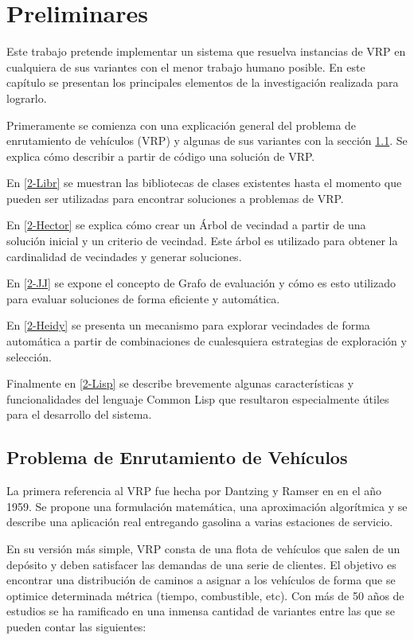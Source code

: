 \chapter{Preliminares}\label{chapter:REV-LL}

Este trabajo pretende implementar un sistema que resuelva instancias de VRP en cualquiera de sus variantes con el menor trabajo humano posible. En este capítulo se presentan los principales elementos de la investigación realizada para lograrlo.

Primeramente se comienza con una explicación general del problema de enrutamiento de vehículos (VRP) y algunas de sus variantes con la sección \ref{2-VRPintro}. Se explica cómo describir a partir de código una solución de VRP.

En \ref{2-Libr} se muestran las bibliotecas de clases existentes hasta el momento que pueden ser utilizadas para encontrar soluciones a problemas de VRP.

En \ref{2-Hector} se explica cómo crear un Árbol de vecindad a partir de una solución inicial y un criterio de vecindad. Este árbol es utilizado para obtener la cardinalidad de vecindades y generar soluciones.

En \ref{2-JJ} se expone el concepto de Grafo de evaluación y cómo es esto utilizado para evaluar soluciones de forma eficiente y automática.

En \ref{2-Heidy} se presenta un mecanismo para explorar vecindades de forma automática a partir de combinaciones de cualesquiera estrategias de exploración y selección.

Finalmente en \ref{2-Lisp} se describe brevemente algunas características y funcionalidades del lenguaje Common Lisp que resultaron especialmente útiles para el desarrollo del sistema.



\section{Problema de Enrutamiento de Vehículos}\label{2-VRPintro}
La primera referencia al VRP fue hecha por Dantzing y Ramser en \cite{Ramsin1959} en el año 1959. Se propone una formulación matemática, una aproximación algorítmica y se describe una aplicación real entregando gasolina a varias estaciones de servicio. 

En su versión más simple, VRP consta de una flota de vehículos que salen de un depósito y deben satisfacer las demandas de una serie de clientes. El objetivo es encontrar una distribución de caminos a asignar a los vehículos de forma que se optimice determinada métrica (tiempo, combustible, etc). Con más de 50 años de estudios se ha ramificado en una inmensa cantidad de variantes entre las que se pueden contar las siguientes:

